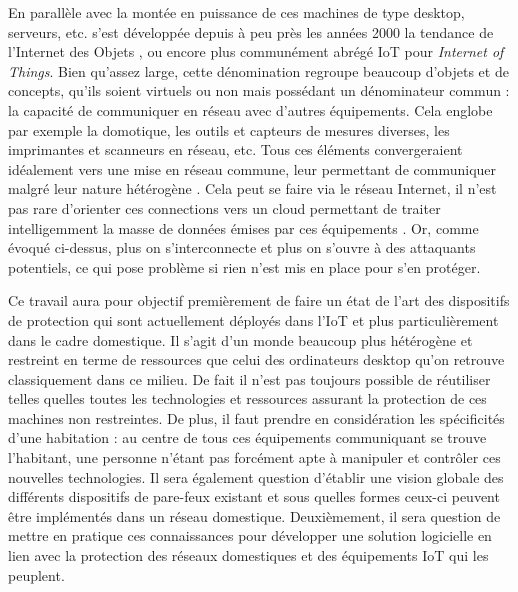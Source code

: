 \documentclass[]{article}
\begin{document}
\par En parallèle avec la montée en puissance de ces machines de type desktop, serveurs, etc. s'est développée depuis à peu près les années 2000 la tendance de l'\og Internet des Objets \fg{}, ou encore plus communément abrégé IoT pour \textit{Internet of Things}. Bien qu'assez large, cette dénomination regroupe beaucoup d'objets et de concepts, qu'ils soient virtuels ou non mais possédant un dénominateur commun : la capacité de communiquer en réseau avec d'autres équipements. Cela englobe par exemple la domotique, les outils et capteurs de mesures diverses, les imprimantes et scanneurs en réseau, etc. Tous ces éléments convergeraient idéalement vers une mise en réseau commune, leur permettant de communiquer malgré leur nature hétérogène \cite{Kubler2014}. Cela peut se faire via le réseau Internet, il n'est pas rare d'orienter ces connections vers un cloud permettant de traiter intelligemment la masse de données émises par ces équipements \cite{Huichen2016}. Or, comme évoqué ci-dessus, plus on s'interconnecte et plus on s'ouvre à des attaquants potentiels, ce qui pose problème si rien n'est mis en place pour s'en protéger.\\

\par Ce travail aura pour objectif premièrement de faire un état de l'art des dispositifs de protection qui sont actuellement déployés dans l'IoT et plus particulièrement dans le cadre domestique. Il s'agit d'un monde beaucoup plus hétérogène et restreint en terme de ressources que celui des ordinateurs desktop qu'on retrouve classiquement dans ce milieu.  De fait il n'est pas toujours possible de réutiliser telles quelles toutes les technologies et ressources assurant la protection de ces machines non restreintes. De plus, il faut prendre en considération les spécificités d'une habitation : au centre de tous ces équipements communiquant se trouve l'habitant, une personne n'étant pas forcément apte à manipuler et contrôler ces nouvelles technologies. Il sera également question d'établir une vision globale des différents dispositifs de pare-feux existant et sous quelles formes ceux-ci peuvent être implémentés dans un réseau domestique. Deuxièmement, il sera question de mettre en pratique ces connaissances pour développer une solution logicielle en lien avec la protection des réseaux domestiques et des équipements IoT qui les peuplent.
\newpage


\end{document}
